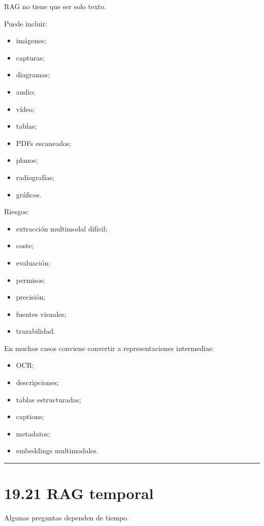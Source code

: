RAG no tiene que ser solo texto.

Puede incluir:

\begin{itemize}
\tightlist
\item
  imágenes;
\item
  capturas;
\item
  diagramas;
\item
  audio;
\item
  vídeo;
\item
  tablas;
\item
  PDFs escaneados;
\item
  planos;
\item
  radiografías;
\item
  gráficos.
\end{itemize}

Riesgos:

\begin{itemize}
\tightlist
\item
  extracción multimodal difícil;
\item
  coste;
\item
  evaluación;
\item
  permisos;
\item
  precisión;
\item
  fuentes visuales;
\item
  trazabilidad.
\end{itemize}

En muchos casos conviene convertir a representaciones intermedias:

\begin{itemize}
\tightlist
\item
  OCR;
\item
  descripciones;
\item
  tablas estructuradas;
\item
  captions;
\item
  metadatos;
\item
  embeddings multimodales.
\end{itemize}

\begin{center}\rule{0.5\linewidth}{0.5pt}\end{center}

\section{19.21 RAG temporal}\label{rag-temporal}

Algunas preguntas dependen de tiempo.

